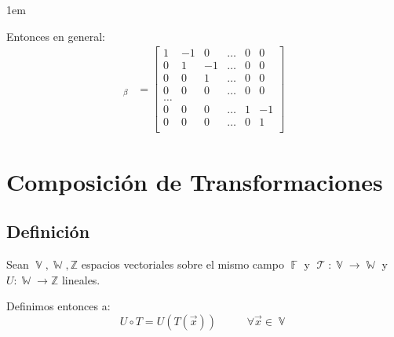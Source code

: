 \documentclass[12pt, fleqn]{report}                             %
\newenvironment{SmallIndentation}[1][0.75em]                    %
        {\begin{adjustwidth}{#1}{}\begin{footnotesize}}             %
        {\end{footnotesize}\end{adjustwidth}}                       %
\DeclareMathOperator \MegaSpace {\quad \quad}                   %
\theoremstyle{break}                                            %
\DeclareMathOperator \GenericField {\mathbb{F}}                 %
\DeclareMathOperator \VectorSet    {\mathbb{V}}                 %
\DeclareMathOperator \SubVectorSet {\mathbb{W}}                 %
\DeclareMathOperator \LinTrans {\mathcal{T}}                    %
\newcommand{\bVector}[1]                                        %
        { \ensuremath{\begin{bmatrix}#1\end{bmatrix}} }             %
\begin{document}
\begin{SmallIndentation}[1em]
                        Entonces en general:
                        \begin{align*}
                            [T]_\beta
                                &= \bVector{
                                    1 & -1 &  0 & \dots & 0 & 0   \\
                                    0 &  1 & -1 & \dots & 0 & 0   \\
                                    0 &  0 &  1 & \dots & 0 & 0   \\
                                    0 &  0 &  0 & \dots & 0 & 0   \\
                                    \dots                         \\
                                    0 &  0 &  0 & \dots & 1 & -1  \\
                                    0 &  0 &  0 & \dots & 0 & 1   \\
                                }
                        \end{align*}
                    
                    \end{SmallIndentation}
                        
            
            
        \clearpage
        \section{Composición de Transformaciones}

            \subsection{Definición}

                Sean $\VectorSet, \SubVectorSet, \mathbb{Z}$ espacios vectoriales sobre el mismo campo
                $\GenericField$ y $\LinTrans: \VectorSet \to \SubVectorSet$ y $U: \SubVectorSet \to \mathbb{Z}$
                lineales.

                Definimos entonces a:
                \begin{equation*}
                    U \circ T
                        = U(T(\vec x)) \MegaSpace \forall \vec x \in \VectorSet
                \end{equation*}
\end{document}
